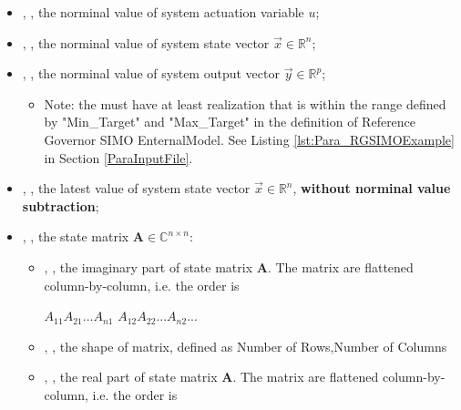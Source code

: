 \begin{itemize}
  \item {}, , 
  the norminal value of system actuation variable \begin{math} u \end{math};
  \item {}, , 
  the norminal value of system state vector \begin{math} \overrightarrow{x}\in\mathbb{R}^n \end{math};
  \item {}, , 
  the norminal value of system output vector \begin{math} \overrightarrow{y}\in\mathbb{R}^p \end{math};
  \begin{itemize}
    \item Note: the  must have at least realization that is within the range defined by 
    "Min\_Target" and "Max\_Target" in the definition of Reference Governor SIMO EnternalModel. 
    See Listing \ref{lst:Para_RGSIMOExample} in Section \ref{ParaInputFile}.
  \end{itemize}
  \item {}, , 
  the latest value of system state vector \begin{math} \overrightarrow{x}\in\mathbb{R}^n \end{math}, 
  \textbf{without norminal value subtraction};

  \item {}, , 
  the state matrix \begin{math} \textbf{A}\in\mathbb{C}^{n \times n} \end{math}:
  \begin{itemize}
    \item {}, , 
    the imaginary part of state matrix \begin{math} \textbf{A} \end{math}. The matrix are flattened 
    column-by-column, i.e. the order is 

    \begin{math} A_{11} A_{21} ... A_{n1} \end{math} \begin{math}A_{12} A_{22} ... A_{n2} ... \end{math}
    \item {}, , 
    the shape of matrix, defined as Number of Rows,Number of Columns
    \item {}, , 
    the real part of state matrix \begin{math} \textbf{A} \end{math}. The matrix are flattened 
    column-by-column, i.e. the order is 


\end{itemize}
\end{itemize}
